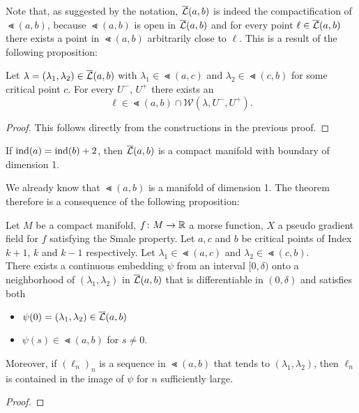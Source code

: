 Note that, as suggested by the notation, ${\overline{\mathcal{L}} } (a, b)$ is indeed the compactification
of $\Lt (a, b)$, because $\Lt (a, b)$ is open in ${\overline{\mathcal{L}} } (a, b)$ and for every point 
$\ell \in {\overline{\mathcal{L}} } (a, b)$ there exists a point in $\Lt (a, b)$ arbitrarily close to $\ell$. 
This is a result of the following proposition:

\begin{prop}
    Let $\lambda = (\lambda_1, \lambda_2) \in {\overline{\mathcal{L}} }(a, b)$ with $\lambda_1 \in \Lt(a, c)$
    and $\lambda_2 \in \Lt (c, b)$ for some critical point $c$. For every $U^-$, 
    $U^+$ there exists an 
    \[ \ell \in \Lt (a, b) \cap \mathcal{W}(\lambda, U^-, U^+). \]
\end{prop}

\begin{proof}
    This follows directly from the constructions in the previous proof.
\end{proof}

\begin{theorem}
    If ${ \operatorname{ind} } (a) = { \operatorname{ind} } (b) + 2$, then ${\overline{\mathcal{L}} }(a, b)$ is a compact manifold with 
    boundary of dimension 1.
\end{theorem}

We already know that $\Lt (a, b)$ is a manifold of dimension 1. The theorem therefore
is a consequence of the following proposition:

\begin{prop}
    Let $M$ be a compact manifold, $f \colon M \to { \mathbb R }$ a morse function, $X$ a pseudo
    gradient field for $f$ satisfying the Smale property. Let $a, c$ and $b$ be critical
    points of Index $k + 1$, $k$ and $k-1$ respectively. Let $\lambda_1 \in \Lt(a, c)$
    and $\lambda_2 \in \Lt(c, b)$. \\
    There exists a continuous embedding $\psi$ from an interval $[0, \delta)$ onto a 
    neighborhood of $(\lambda_1, \lambda_2)$ in ${\overline{\mathcal{L}} } (a, b)$ that is differentiable in 
    $(0, \delta)$ and satisfies both 
    \begin{itemize}
        \item $\psi(0) = (\lambda_1, \lambda_2) \in {\overline{\mathcal{L}} }(a, b)$
        \item $\psi(s) \in \Lt(a, b)$ for $s \neq 0$.
    \end{itemize}
    Moreover, if $(\ell_n)_n$ is a sequence in $\Lt (a, b)$ that tends to $(\lambda_1, \lambda_2)$,
    then $\ell_n$ is contained in the image of $\psi$ for $n$ sufficiently large.
\end{prop}

\begin{proof}
    
\end{proof}
